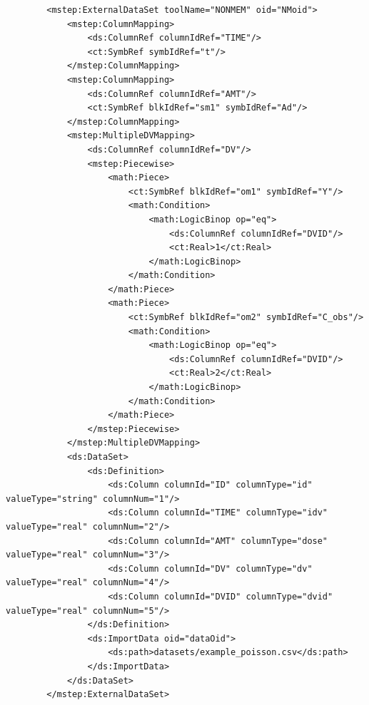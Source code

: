 \lstset{language=XML}
\begin{lstlisting}
        <mstep:ExternalDataSet toolName="NONMEM" oid="NMoid">
            <mstep:ColumnMapping>
                <ds:ColumnRef columnIdRef="TIME"/>
                <ct:SymbRef symbIdRef="t"/>
            </mstep:ColumnMapping>
            <mstep:ColumnMapping>
                <ds:ColumnRef columnIdRef="AMT"/>
                <ct:SymbRef blkIdRef="sm1" symbIdRef="Ad"/>
            </mstep:ColumnMapping>
            <mstep:MultipleDVMapping>
                <ds:ColumnRef columnIdRef="DV"/>
                <mstep:Piecewise>
                    <math:Piece>
                        <ct:SymbRef blkIdRef="om1" symbIdRef="Y"/>
                        <math:Condition>
                            <math:LogicBinop op="eq">
                                <ds:ColumnRef columnIdRef="DVID"/>
                                <ct:Real>1</ct:Real>
                            </math:LogicBinop>
                        </math:Condition>
                    </math:Piece>
                    <math:Piece>
                        <ct:SymbRef blkIdRef="om2" symbIdRef="C_obs"/>
                        <math:Condition>
                            <math:LogicBinop op="eq">
                                <ds:ColumnRef columnIdRef="DVID"/>
                                <ct:Real>2</ct:Real>
                            </math:LogicBinop>
                        </math:Condition>
                    </math:Piece>
                </mstep:Piecewise>
            </mstep:MultipleDVMapping>
            <ds:DataSet>
                <ds:Definition>
                    <ds:Column columnId="ID" columnType="id" valueType="string" columnNum="1"/>
                    <ds:Column columnId="TIME" columnType="idv" valueType="real" columnNum="2"/>
                    <ds:Column columnId="AMT" columnType="dose" valueType="real" columnNum="3"/>
                    <ds:Column columnId="DV" columnType="dv" valueType="real" columnNum="4"/>
                    <ds:Column columnId="DVID" columnType="dvid" valueType="real" columnNum="5"/>
                </ds:Definition>
                <ds:ImportData oid="dataOid">
                    <ds:path>datasets/example_poisson.csv</ds:path>
                </ds:ImportData>
            </ds:DataSet>
        </mstep:ExternalDataSet>
\end{lstlisting}


